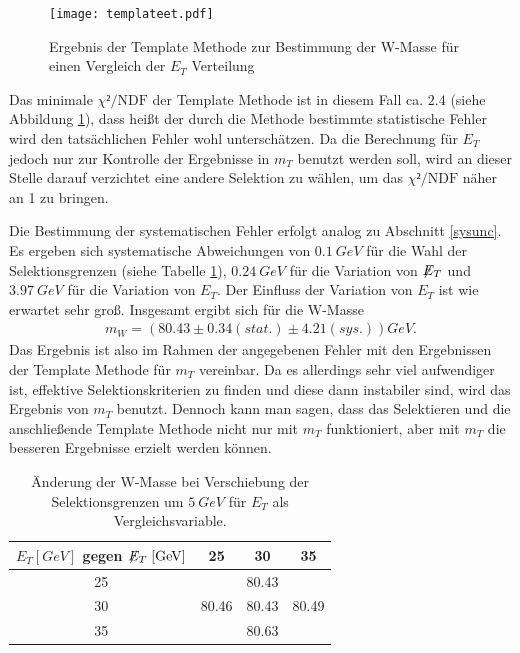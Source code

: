 \documentclass[a4paper,12pt]{article}
\newcommand{\met}{\ensuremath{\not\mathrel{E}}_T}
\begin{document}



\begin{figure}[htb]
	\centering
	\texttt{[image: templateet.pdf]}
	\caption{Ergebnis der Template Methode zur Bestimmung der W-Masse für einen Vergleich der $E_{T}$ Verteilung}
	\label{fig:chiet}
\end{figure}
Das minimale $χ²/\text{NDF}$ der Template Methode ist in diesem Fall ca. $2.4$ (siehe Abbildung
\ref{fig:chiet}), dass heißt der durch die Methode bestimmte statistische Fehler wird
den tatsächlichen Fehler wohl unterschätzen. Da die Berechnung für $E_{T}$ jedoch nur zur Kontrolle der Ergebnisse in $m_{T}$ benutzt werden soll,
wird an dieser Stelle darauf verzichtet eine andere Selektion zu wählen, um das $χ²/\text{NDF}$ näher an 1 zu bringen.

Die Bestimmung der systematischen Fehler erfolgt analog zu
Abschnitt \ref{sysunc}. Es ergeben sich systematische Abweichungen von $\SI{0.1}{GeV}$ für die Wahl der Selektionsgrenzen (siehe Tabelle \ref{tab:variation_et}), $\SI{0.24}{GeV}$
für die Variation von $\met$ und $\SI{3.97}{GeV}$ für die Variation von $E_{T}$. Der Einfluss der Variation von $E_{T}$ ist wie erwartet sehr groß.
Insgesamt ergibt sich für die W-Masse
\begin{align*}
	m_W = ( 80.43 ± 0.34 (stat.)± 4.21 (sys.)) \si{GeV}.
\end{align*}
Das Ergebnis ist also im Rahmen der angegebenen Fehler mit den Ergebnissen der Template Methode für
$m_{T}$ vereinbar.
Da es allerdings sehr viel aufwendiger ist, effektive Selektionskriterien zu finden und diese dann
instabiler sind, wird das Ergebnis von $m_T$ benutzt.
Dennoch kann man sagen, dass das Selektieren und die anschließende Template Methode nicht nur mit
$m_T$ funktioniert, aber mit $m_T$ die besseren Ergebnisse erzielt werden können.
\begin{table}[h]
	\centering
	\begin{tabular}{c| c c c}
		$E_{T} [\si{GeV}]$ gegen $\met[\si{GeV}]$ & 25 & 30 & 35 \\
		\hline
		25 &  & 80.43 & \\
		30 & 80.46 & 80.43 & 80.49 \\
		35 &  & 80.63 &
	\end{tabular}
	\caption{Änderung der W-Masse bei Verschiebung der Selektionsgrenzen um $\SI{5}{GeV}$ für $E_T$
als Vergleichsvariable.}
	\label{tab:variation_et}
\end{table}
\end{document}
